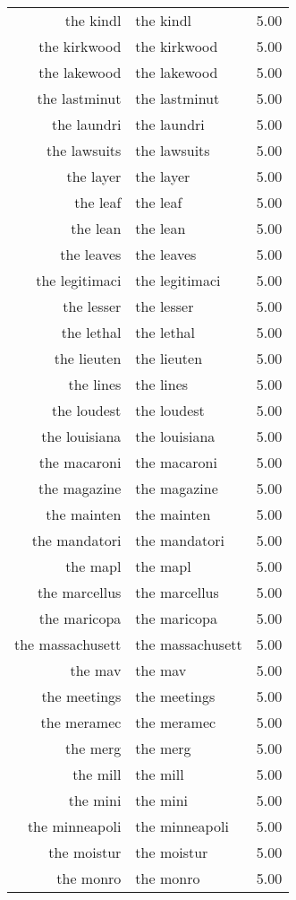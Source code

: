 \begin{table}[ht]
\begin{tabular}{rlr}
  the kindl & the kindl & 5.00 \\ 
  the kirkwood & the kirkwood & 5.00 \\ 
  the lakewood & the lakewood & 5.00 \\ 
  the lastminut & the lastminut & 5.00 \\ 
  the laundri & the laundri & 5.00 \\ 
  the lawsuits & the lawsuits & 5.00 \\ 
  the layer & the layer & 5.00 \\ 
  the leaf & the leaf & 5.00 \\ 
  the lean & the lean & 5.00 \\ 
  the leaves & the leaves & 5.00 \\ 
  the legitimaci & the legitimaci & 5.00 \\ 
  the lesser & the lesser & 5.00 \\ 
  the lethal & the lethal & 5.00 \\ 
  the lieuten & the lieuten & 5.00 \\ 
  the lines & the lines & 5.00 \\ 
  the loudest & the loudest & 5.00 \\ 
  the louisiana & the louisiana & 5.00 \\ 
  the macaroni & the macaroni & 5.00 \\ 
  the magazine & the magazine & 5.00 \\ 
  the mainten & the mainten & 5.00 \\ 
  the mandatori & the mandatori & 5.00 \\ 
  the mapl & the mapl & 5.00 \\ 
  the marcellus & the marcellus & 5.00 \\ 
  the maricopa & the maricopa & 5.00 \\ 
  the massachusett & the massachusett & 5.00 \\ 
  the mav & the mav & 5.00 \\ 
  the meetings & the meetings & 5.00 \\ 
  the meramec & the meramec & 5.00 \\ 
  the merg & the merg & 5.00 \\ 
  the mill & the mill & 5.00 \\ 
  the mini & the mini & 5.00 \\ 
  the minneapoli & the minneapoli & 5.00 \\ 
  the moistur & the moistur & 5.00 \\ 
  the monro & the monro & 5.00 \\ 

\end{tabular}
\end{table}
